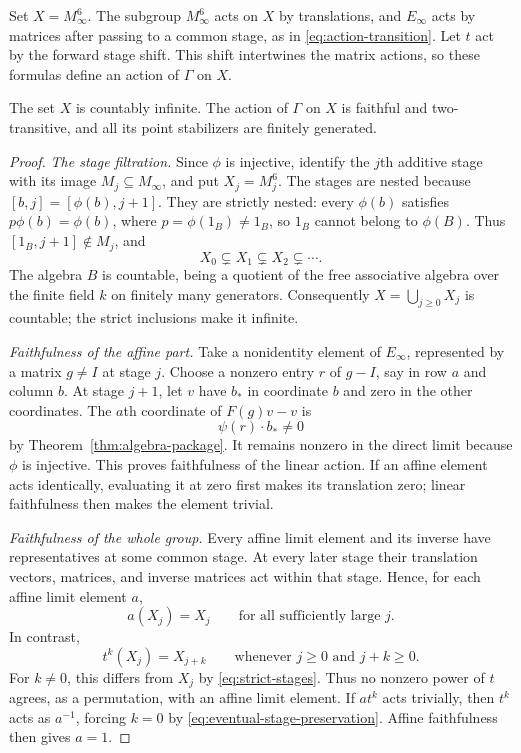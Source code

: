 Set $X=M_\infty^6$. The subgroup $M_\infty^6$ acts on $X$ by
translations, and $E_\infty$ acts by matrices after passing to a common
stage, as in \eqref{eq:action-transition}. Let $t$ act by the forward
stage shift. This shift intertwines the matrix actions, so these formulas define an
action of $\Gamma$ on $X$.

\begin{proposition}\label{prop:two-transitive-action}
The set $X$ is countably infinite.  The action of $\Gamma$ on $X$ is
faithful and two-transitive, and all its point stabilizers are finitely
generated.
\end{proposition}

\begin{proof}
\emph{The stage filtration.}
Since $\phi$ is injective, identify the $j$th additive stage with its
image $M_j\subseteq M_\infty$, and put $X_j=M_j^6$.  The stages are
nested because $[b,j]=[\phi(b),j+1]$.  They are strictly nested:
every $\phi(b)$ satisfies $p\phi(b)=\phi(b)$, where
$p=\phi(1_B)\ne1_B$, so $1_B$ cannot belong to $\phi(B)$.
Thus $[1_B,j+1]\notin M_j$, and
\begin{equation}\label{eq:strict-stages}
 X_0\subsetneq X_1\subsetneq X_2\subsetneq\cdots.
\end{equation}
The algebra $B$ is countable, being a quotient of the free associative
algebra over the finite field $k$ on finitely many generators.
Consequently $X=\bigcup_{j\geq0}X_j$ is countable; the strict inclusions
make it infinite.

\emph{Faithfulness of the affine part.}
Take a nonidentity element of $E_\infty$, represented by a matrix
$g\ne I$ at stage $j$.  Choose a nonzero entry $r$ of $g-I$, say in
row $a$ and column $b$.  At stage $j+1$, let $v$ have $b_*$ in
coordinate $b$ and zero in the other coordinates.  The $a$th coordinate
of $F(g)v-v$ is
\[
 \psi(r)\cdot b_*\ne0
\]
by Theorem~\ref{thm:algebra-package}.  It remains nonzero in the direct
limit because $\phi$ is injective.  This proves faithfulness of the
linear action.  If an affine element acts identically, evaluating it
at zero first makes its translation zero; linear faithfulness then
makes the element trivial.

\emph{Faithfulness of the whole group.}
Every affine limit element and its inverse have representatives at
some common stage.  At every later stage their translation vectors,
matrices, and inverse matrices act within that stage.  Hence, for each
affine limit element $a$,
\begin{equation}\label{eq:eventual-stage-preservation}
 a(X_j)=X_j\qquad\text{for all sufficiently large }j.
\end{equation}
In contrast,
\[
 t^k(X_j)=X_{j+k}
 \qquad\text{whenever }j\geq0\text{ and }j+k\geq0.
\]
For $k\ne0$, this differs from $X_j$ by
\eqref{eq:strict-stages}.  Thus no nonzero power of $t$ agrees, as a
permutation, with an affine limit element.  If $a t^k$ acts trivially,
then $t^k$ acts as $a^{-1}$, forcing $k=0$ by
\eqref{eq:eventual-stage-preservation}.  Affine faithfulness then gives
$a=1$.


\end{proof}
